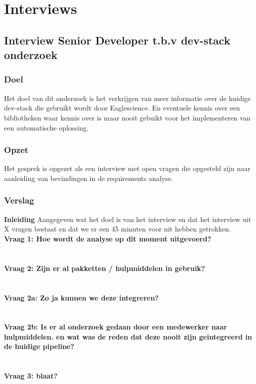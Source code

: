 
\chapter{Interviews}

\section{Interview Senior Developer t.b.v dev-stack onderzoek}
\subsection{Doel}
Het doel van dit onderzoek is het verkrijgen van meer informatie over de huidige dev-stack die gebruikt wordt door Eaglescience. En eventuele kennis over een bibliotheken waar kennis over is maar nooit gebuikt voor het implementeren van een automatische oplossing.
\subsection{Opzet}
Het gesprek is opgezet als een interview met open vragen die opgesteld zijn naar aanleiding van bevindingen in de requirements analyse.
\subsection{Verslag}
\textbf{Inleiding}
Aangegeven wat het doel is van het interview en dat het interview uit X vragen bestaat en dat we er een 45 minuten voor uit hebben getrokken.\\
\textbf{Vraag 1: Hoe wordt de analyse op dit moment uitgevoerd?}\\
\lipsum[01]\\
\\
\textbf{Vraag 2: Zijn er al pakketten / hulpmiddelen in gebruik?}\\
\lipsum[02]\\
\\
\textbf{Vraag 2a: Zo ja kunnen we deze integreren?}\\
\lipsum[03]\\
\\
\textbf{Vraag 2b: Is er al onderzoek gedaan door een medewerker naar hulpmiddelen. en wat was de reden dat deze nooit zijn geintegreerd in de huidige pipeline?}\\
\lipsum[04]\\
\\
\textbf{Vraag 3: blaat?}\\
\lipsum[05]\\

